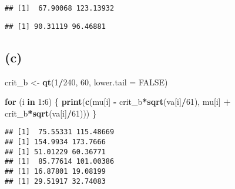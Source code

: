 \documentclass[
]{article}
\newenvironment{Shaded}{\begin{snugshade}}{\end{snugshade}}
\newcommand{\AttributeTok}[1]{\textcolor[rgb]{0.13,0.29,0.53}{#1}}
\newcommand{\ConstantTok}[1]{\textcolor[rgb]{0.56,0.35,0.01}{#1}}
\newcommand{\ControlFlowTok}[1]{\textcolor[rgb]{0.13,0.29,0.53}{\textbf{#1}}}
\newcommand{\DecValTok}[1]{\textcolor[rgb]{0.00,0.00,0.81}{#1}}
\newcommand{\FunctionTok}[1]{\textcolor[rgb]{0.13,0.29,0.53}{\textbf{#1}}}
\newcommand{\NormalTok}[1]{#1}
\newcommand{\OtherTok}[1]{\textcolor[rgb]{0.56,0.35,0.01}{#1}}
\newcommand{\SpecialCharTok}[1]{\textcolor[rgb]{0.81,0.36,0.00}{\textbf{#1}}}
\begin{document}
\begin{verbatim}
## [1]  67.90068 123.13932
\end{verbatim}

\begin{Shaded}
\end{Shaded}

\begin{verbatim}
## [1] 90.31119 96.46881
\end{verbatim}

\subsection{(c)}\label{c}

\begin{Shaded}
\begin{Highlighting}[]
\NormalTok{crit\_b }\OtherTok{\textless{}{-}} \FunctionTok{qt}\NormalTok{(}\DecValTok{1}\SpecialCharTok{/}\DecValTok{240}\NormalTok{, }\DecValTok{60}\NormalTok{, }\AttributeTok{lower.tail =} \ConstantTok{FALSE}\NormalTok{)}

\ControlFlowTok{for}\NormalTok{ (i }\ControlFlowTok{in} \DecValTok{1}\SpecialCharTok{:}\DecValTok{6}\NormalTok{) \{}
  \FunctionTok{print}\NormalTok{(}\FunctionTok{c}\NormalTok{(mu[i] }\SpecialCharTok{{-}}\NormalTok{ crit\_b}\SpecialCharTok{*}\FunctionTok{sqrt}\NormalTok{(va[i]}\SpecialCharTok{/}\DecValTok{61}\NormalTok{), mu[i] }\SpecialCharTok{+}\NormalTok{ crit\_b}\SpecialCharTok{*}\FunctionTok{sqrt}\NormalTok{(va[i]}\SpecialCharTok{/}\DecValTok{61}\NormalTok{)))}
\NormalTok{\}}
\end{Highlighting}
\end{Shaded}

\begin{verbatim}
## [1]  75.55331 115.48669
## [1] 154.9934 173.7666
## [1] 51.01229 60.36771
## [1]  85.77614 101.00386
## [1] 16.87801 19.08199
## [1] 29.51917 32.74083
\end{verbatim}
\end{document}
